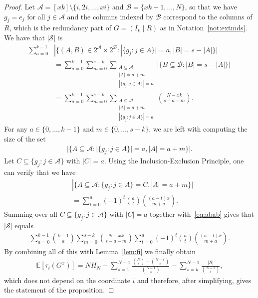 \documentclass[10pt,a4paper]{amsart}
\newcommand{\E}{\mathbb{E}}
\newcommand{\mA}{\mathcal{A}}
\newcommand{\mB}{\mathcal{B}}
\newcommand{\mS}{\mathcal{S}}
\begin{document}
\begin{proof}
    Let $\mA=[xk]\setminus\{i,2i,\dots,xi\}$ and $\mB=\{xk+1,\dots,N\}$, so that we have $g_j=e_j$ for all $j \in \mA$ and the columns indexed by $\mB$ correspond to the columns of $R$, which is the redundancy part of $G=(I_k \mid R)$ as in Notation~\ref{not:extmds}.
    We have that $|\mS|$ is
    \begin{align} \label{eq:abab}
         \sum_{a=0}^{k-1} & |\{(A,B) \in 2^{\mA} \times 2^{\mB}  : |\{ g_j : j \in A\}|=a, |B| = s-|A|\}| \nonumber \\
        &=\sum_{a=0}^{k-1}\sum_{m=0}^{s-k}\sum_{\substack{A \subseteq \mA \\ |A|=a+m \\ |\{ g_j : j \in A\}|=a}}|\{B \subseteq \mB :   |B| = s-|A|\}| \nonumber \\
        &= \sum_{a=0}^{k-1}\sum_{m=0}^{s-k}\sum_{\substack{A \subseteq \mA \\ |A|=a+m \\ |\{ g_j : j \in A\}|=a}} \binom{N-xk}{s-a-m}.
    \end{align}
    For any $a \in \{0, \dots, k-1\}$ and $m \in \{0,\dots,s-k\}$, we are left with computing the size of the set
    \begin{align*}
        |\{A \subseteq \mA : |\{ g_j : j \in A\}|=a, |A|=a+m\}|.
    \end{align*}
    Let $C \subseteq \{g_j : j \in \mA\}$ with $|C|=a$. Using the Inclusion-Exclusion Principle, one can verify that we have
    \begin{align*}
        &|\{A \subseteq \mA : \{ g_j : j \in A\}=C, |A|=a+m\}| \\
        &= \sum_{t=0}^a(-1)^t\binom{a}{t}\binom{(a-t)x}{m+a}.
    \end{align*}
    Summing over all $C \subseteq \{g_j : j \in \mA\}$ with $|C|=a$ together with~\eqref{eq:abab} gives that $|\mS|$ equals
    \begin{align*}
      \sum_{a=0}^{k-1}\binom{k-1}{a} \sum_{m=0}^{s-k}\binom{N-xk}{s-a-m}\sum_{t=0}^a(-1)^t\binom{a}{t}\binom{(a-t)x}{m+a}.
    \end{align*}
By combining all of this
with Lemma~\ref{lem:fi} we finally obtain
\begin{align*}
\E[\tau_i(G^x)] = NH_N-\sum_{s=1}^{N-1}\frac{\binom{N}{s}-\binom{N-x}{s}}{\binom{N-1}{s}}-\sum_{s=k}^{N-1}\frac{|\mS|}{\binom{N-1}{s}},
\end{align*}
which does not depend on the coordinate $i$ and therefore, after simplifying, gives the statement of the proposition.

\end{proof}
\end{document}
